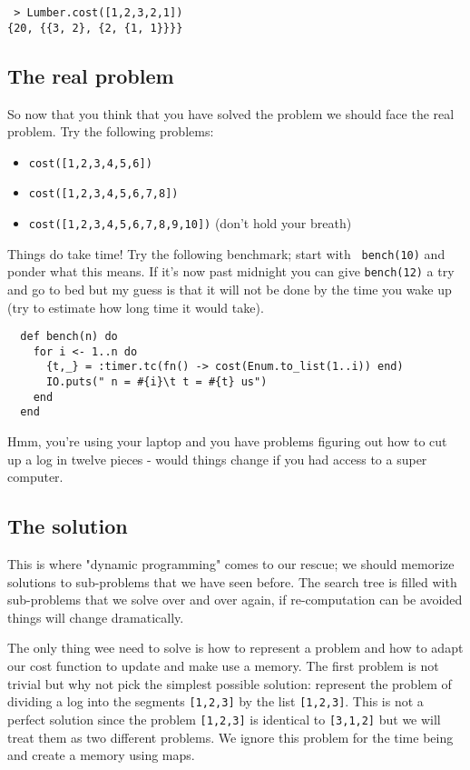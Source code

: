 \documentclass[a4paper,11pt]{article}
\begin{document}
\begin{verbatim}
 > Lumber.cost([1,2,3,2,1])
{20, {{3, 2}, {2, {1, 1}}}}
\end{verbatim}

\subsection*{The real problem}

So now that you think that you have solved the problem we should face
the real problem. Try the following problems:

\begin{itemize}
\item {\tt cost([1,2,3,4,5,6])}
\item {\tt cost([1,2,3,4,5,6,7,8])}
\item {\tt cost([1,2,3,4,5,6,7,8,9,10])} (don't hold your breath)
\end{itemize}

Things do take time! Try the following benchmark; start with {\tt
  bench(10)} and ponder what this means. If it's now past midnight you
can give {\tt bench(12)} a try and go to bed but my guess is that it
will not be done by the time you wake up (try to estimate how long
time it would take).

\begin{verbatim}
  def bench(n) do
    for i <- 1..n do
      {t,_} = :timer.tc(fn() -> cost(Enum.to_list(1..i)) end)
      IO.puts(" n = #{i}\t t = #{t} us")
    end
  end
\end{verbatim}

Hmm, you're using your laptop and you have problems figuring out how
to cut up a log in twelve pieces - would things change if you had
access to a super computer.


\subsection*{The solution}

This is where "dynamic programming" comes to our rescue; we should
memorize solutions to sub-problems that we have seen before. The search
tree is filled with sub-problems that we solve over and over again, if
re-computation can be avoided things will change dramatically.

The only thing wee need to solve is how to represent a problem and how
to adapt our cost function to update and make use a memory. The first
problem is not trivial but why not pick the simplest possible
solution: represent the problem of dividing a log into the segments
{\tt [1,2,3]} by the list {\tt [1,2,3]}. This is not a perfect
solution since the problem {\tt [1,2,3]} is identical to {\tt [3,1,2]}
but we will treat them as two different problems. We ignore this
problem for the time being and create a memory using maps.
\end{document}
